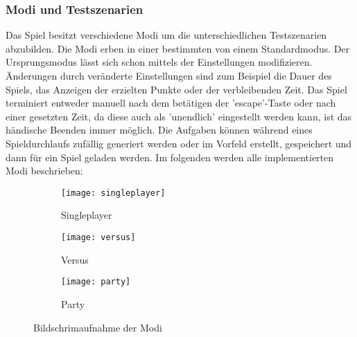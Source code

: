 \subsubsection{Modi und Testszenarien}
Das Spiel besitzt verschiedene Modi um die unterschiedlichen Testszenarien abzubilden. Die Modi erben in einer bestimmten von einem Standardmodus. Der Ursprungsmodus lässt sich schon mittels der Einstellungen modifizieren. Änderungen durch veränderte Einstellungen sind zum Beispiel die Dauer des Spiels, das Anzeigen der erzielten Punkte oder der verbleibenden Zeit. Das Spiel terminiert entweder manuell nach dem betätigen der 'escape'-Taste oder nach einer gesetzten Zeit, da diese auch als 'unendlich' eingestellt werden kann, ist das händische Beenden immer möglich. Die Aufgaben können während eines Spieldurchlaufs zufällig generiert werden oder im Vorfeld erstellt, gespeichert und dann für ein Spiel geladen werden. Im folgenden werden alle implementierten Modi beschrieben:\itemize

\begin{figure}[b]
	\centering	
	\begin{subfigure}[a]{0.3\linewidth}
		\texttt{[image: singleplayer]}
		\caption{Singleplayer}
		\label{fig:singleplayer}
	\end{subfigure}	
	\begin{subfigure}[a]{0.3\linewidth}
		\texttt{[image: versus]}
		\caption{Versus}
		\label{fig:versus}
	\end{subfigure}
	\begin{subfigure}[a]{0.3\linewidth}
		\texttt{[image: party]}
		\caption{Party}
		\label{fig:party}
	\end{subfigure}	
	\caption{Bildschrimaufnahme der Modi}
    \label{fig:modi}
\end{figure}


